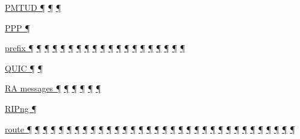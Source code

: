 \documentclass[
]{article}
\begin{document}
\hyperref[extension-headers-and-options]{PMTUD ¶}
\hyperref[filtering]{¶} \hyperref[packet-size-and-jumbo-frames]{¶}

\hyperref[layer-2-functions]{PPP ¶}

\hyperref[obsolete-features-in-ipv6]{prefix ¶} \hyperref[addresses]{¶}
\hyperref[auto-configuration]{¶} \hyperref[managed-configuration]{¶}
\hyperref[routing]{¶}
\hyperref[source-and-destination-address-selection]{¶}
\hyperref[dual-stack-scenarios]{¶}
\hyperref[ipv6-primary-differences-from-ipv4]{¶}
\hyperref[translation-and-ipv4-as-a-service]{¶} \hyperref[tunnels]{¶}
\hyperref[security]{¶} \hyperref[filtering]{¶}
\hyperref[layer-2-considerations]{¶} \hyperref[topology-obfuscation]{¶}
\hyperref[network-design]{¶} \hyperref[address-planning]{¶}
\hyperref[prefix-per-host]{¶}
\hyperref[address-and-prefix-management]{¶}
\hyperref[multi-prefix-operation]{¶} \hyperref[multihoming]{¶}

\hyperref[transport-protocols]{QUIC ¶} \hyperref[multihoming]{¶}

\hyperref[address-resolution]{RA messages ¶}
\hyperref[auto-configuration]{¶} \hyperref[managed-configuration]{¶}
\hyperref[routing]{¶} \hyperref[prefix-per-host]{¶}
\hyperref[multi-prefix-operation]{¶}

\hyperref[routing]{RIPng ¶}

\hyperref[why-version-6]{route ¶}
\hyperref[obsolete-features-in-ipv6]{¶}
\hyperref[ipv6-basic-technology]{¶} \hyperref[address-resolution]{¶}
\hyperref[addresses]{¶} \hyperref[auto-configuration]{¶}
\hyperref[dns]{¶} \hyperref[extension-headers-and-options]{¶}
\hyperref[layer-2-functions]{¶} \hyperref[managed-configuration]{¶}
\hyperref[packet-format]{¶} \hyperref[routing]{¶}
\hyperref[traffic-class-and-flow-label]{¶} \hyperref[further-reading]{¶}
\hyperref[coexistence-with-legacy-ipv4]{¶}
\hyperref[dual-stack-scenarios]{¶}
\hyperref[ipv6-primary-differences-from-ipv4]{¶}
\hyperref[translation-and-ipv4-as-a-service]{¶} \hyperref[tunnels]{¶}
\hyperref[filtering]{¶} \hyperref[layer-2-considerations]{¶}
\hyperref[topology-obfuscation]{¶} \hyperref[network-design]{¶}
\hyperref[address-planning]{¶} \hyperref[management-and-operations]{¶}
\hyperref[address-and-prefix-management]{¶}
\hyperref[energy-consumption]{¶} \hyperref[multi-prefix-operation]{¶}
\hyperref[multihoming]{¶} \hyperref[packet-size-and-jumbo-frames]{¶}
\hyperref[routing-operation]{¶} \hyperref[deployment-by-carriers]{¶}
\hyperref[deployment-in-the-enterprise]{¶}
\hyperref[deployment-in-the-home]{¶}
\end{document}
